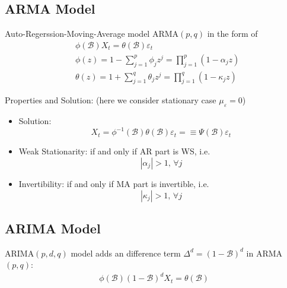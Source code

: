     

\subsection{ARMA Model}
    Auto-Regerssion-Moving-Average model ARMA$ (p,q) $ in the form of 
    \begin{align}
        &\phi (\mathscr{B} )X_t=\theta (\mathscr{B} )\varepsilon _t\\
        &\phi (z)=1-\sum_{j=1}^p \phi _jz^j=\prod_{j=1}^p(1-\alpha _jz)\\
        &\theta (z)=1+\sum_{j=1}^q\theta _jz^j=\prod_{j=1}^q(1-\kappa _jz)
    \end{align}
    
    
    \begin{point}
        Properties and Solution: (here we consider stationary case $ \mu _\varepsilon =0 $)
    \end{point}

    \begin{itemize}[topsep=2pt,itemsep=0pt]
        \item Solution:
        \begin{equation}
            X_t=\phi ^{-1}(\mathscr{B} )\theta (\mathscr{B} )\varepsilon _t =\equiv \Psi (\mathscr{B} )\varepsilon _t
        \end{equation}
        \item Weak Stationarity: if and only if AR part is WS, i.e.
        \begin{equation}
            |\alpha _j|>1,\,\forall j 
        \end{equation}
        \item Invertibility: if and only if MA part is invertible, i.e.
        \begin{equation}
            |\kappa _j|>1,\,\forall j 
        \end{equation}
        
    \end{itemize}
    
\subsection{ARIMA Model}
    ARIMA$ (p,d,q) $ model adds an difference term $ \Delta ^d=(1-\mathscr{B} )^d $ in ARMA$ (p,q) $:
    \begin{align}
        \phi (\mathscr{B} )(1-\mathscr{B} )^dX_t=\theta (\mathscr{B} )
    \end{align}
    
